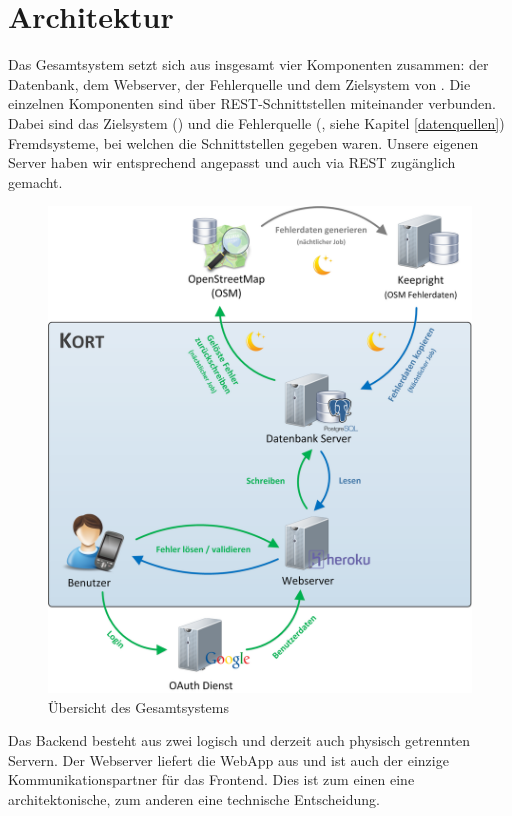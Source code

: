 \chapter{Architektur}
\label{architektur}

Das Gesamtsystem setzt sich aus insgesamt vier Komponenten zusammen: der Datenbank, dem Webserver, der Fehlerquelle und dem Zielsystem von . 
Die einzelnen Komponenten sind über \gls{REST}-Schnittstellen miteinander verbunden. 
Dabei sind das Zielsystem () und die Fehlerquelle (, siehe Kapitel \ref{datenquellen}) Fremdsysteme, bei welchen die Schnittstellen gegeben waren. 
Unsere eigenen Server haben wir entsprechend angepasst und auch via \gls{REST} zugänglich gemacht.

\begin{figure}[H]
	\centering
	\includegraphics[scale=0.32]{images/implementation/backend/kort-big_picture}
	\caption{Übersicht des Gesamtsystems}
	\label{image-kort-big-picture}
\end{figure}

Das Backend besteht aus zwei logisch und derzeit auch physisch getrennten Servern. 
Der Webserver liefert die \gls{WebApp} aus und ist auch der einzige Kommunikationspartner für das Frontend. Dies ist zum einen eine architektonische, zum anderen eine technische Entscheidung.

